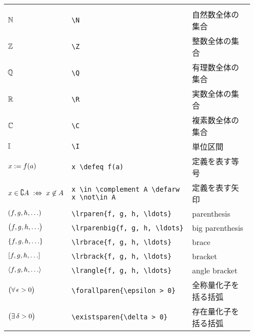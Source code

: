 \documentclass[uplatex, dvipdfmx, 12pt, crop=false]{standalone}
\begin{document}
\begin{table}[htb]
\begin{tabular}{ll@{\qquad}l}
		\tablesubtitle{基礎的な数式記号} \\
		$\mathbb{N}$                                      & \verb|\N|                                      & 自然数全体の集合                   \\
		$\mathbb{Z}$                                      & \verb|\Z|                                      & 整数全体の集合                     \\
		$\mathbb{Q}$                                      & \verb|\Q|                                      & 有理数全体の集合                   \\
		$\mathbb{R}$                                      & \verb|\R|                                      & 実数全体の集合                     \\
		$\mathbb{C}$                                      & \verb|\C|                                      & 複素数全体の集合                   \\
		$\mathbb{I}$                                      & \verb|\I|                                      & 単位区間                           \\
		$x \mathrel{:=} f(a)$                           & \verb|x \defeq f(a)|                           & 定義を表す等号                     \\
		$x \in \complement A \mathrel{\ :\Leftrightarrow\ } x \not\in A$ & \verb|x \in \complement A \defarw x \not\in A| & 定義を表す矢印                     \\
		$\lrparen{f, g, h, \ldots}$               & \verb|\lrparen{f, g, h, \ldots}|               & parenthesis                        \\
		$\bigl({f, g, h, \ldots}\bigr)$            & \verb|\lrparenbig{f, g, h, \ldots}|            & big parenthesis                    \\
		$\lrbrace{f, g, h, \ldots}$               & \verb|\lrbrace{f, g, h, \ldots}|               & brace                              \\
		$\lrbrack{f, g, h, \ldots}$               & \verb|\lrbrack{f, g, h, \ldots}|               & bracket                            \\
		$\lrangle{f, g, h, \ldots}$               & \verb|\lrangle{f, g, h, \ldots}|               & angle bracket                      \\
		$\bigl({\forall\, \epsilon > 0}\bigr)$              & \verb|\forallparen{\epsilon > 0}|              & 全称量化子を括る括弧               \\
		$\bigl({\exists\, \delta > 0}\bigr)$                & \verb|\existsparen{\delta > 0}|                & 存在量化子を括る括弧               \\

\end{tabular}
\end{table}
\end{document}
